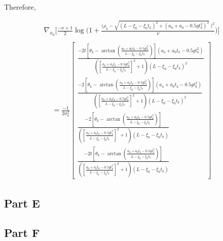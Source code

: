 \documentclass[11pt]{article}
\begin{document}
Therefore,

\begin{align*}
    \nabla_{x_0}\Bigg[\frac{-\nu+1}{2}\log\Bigg(1+ \frac{\Big(\rho_k - \sqrt{(L-\xi_0 - \dot{\xi_0}t_k)^2 + (a_0 + \dot{a_0} - 0.5gt_k^2)^2} \ \Big)^2}{\nu}\Bigg)\Bigg] \\
\end{align*}
\begin{align}
    = \frac{-1}{2\sigma_b^2} \begin{bmatrix}
        \frac{-2t[\theta_k - \arctan(\frac{a_0 + \dot{a_0}t_k - 0.5gt_k^2}{L-\xi_0-\dot{\xi_0}t_k})](a_o+\dot{a_0}t_k-0.5gt_k^2)}{([\frac{a_0 + \dot{a_0}t_k - 0.5gt_k^2}{L-\xi_0-\dot{\xi_0}t_k}]^2 + 1)(L-\xi_0-\dot{\xi_0}t_k)^2} \\
        \frac{-2[\theta_k - \arctan(\frac{a_0 + \dot{a_0}t_k - 0.5gt_k^2}{L-\xi_0-\dot{\xi_0}t_k})](a_o+\dot{a_0}t_k-0.5gt_k^2)}{([\frac{a_0 + \dot{a_0}t_k - 0.5gt_k^2}{L-\xi_0-\dot{\xi_0}t_k}]^2 + 1)(L-\xi_0-\dot{\xi_0}t_k)^2} \\
        \frac{-2[\theta_k - \arctan(\frac{a_0 + \dot{a_0}t_k - 0.5gt_k^2}{L-\xi_0-\dot{\xi_0}t_k})]}{([\frac{a_0 + \dot{a_0}t_k - 0.5gt_k^2}{L-\xi_0-\dot{\xi_0}t_k}]^2 + 1)(L-\xi_0-\dot{\xi_0}t_k)} \\
        \frac{-2t[\theta_k - \arctan(\frac{a_0 + \dot{a_0}t_k - 0.5gt_k^2}{L-\xi_0-\dot{\xi_0}t_k})]}{([\frac{a_0 + \dot{a_0}t_k - 0.5gt_k^2}{L-\xi_0-\dot{\xi_0}t_k}]^2 + 1)(L-\xi_0-\dot{\xi_0}t_k)}
    \end{bmatrix}
    \label{Grad2}
\end{align}

\subsection{Part E}
\subsection{Part F}



\end{document}
